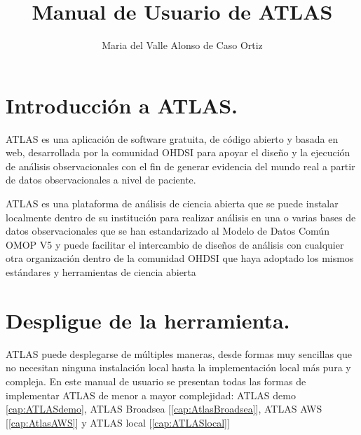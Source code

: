 \documentclass{article}
\title{Manual de Usuario de ATLAS}
\author{Maria del Valle Alonso de Caso Ortiz}
\begin{document}
\maketitle



\section{Introducción a ATLAS.}

ATLAS es una aplicación de software gratuita, de código abierto y basada en web, desarrollada por la comunidad OHDSI para apoyar el diseño y la ejecución de análisis observacionales con el fin de generar evidencia del mundo real a partir de datos observacionales a nivel de paciente.

ATLAS es una plataforma de análisis de ciencia abierta que se puede instalar localmente dentro de su institución para realizar análisis en una o varias bases de datos observacionales que se han estandarizado al Modelo de Datos Común OMOP V5 y puede facilitar el intercambio de diseños de análisis con cualquier otra organización dentro de la comunidad OHDSI que haya adoptado los mismos estándares y herramientas de ciencia abierta \cite{OHDSIAtlasWiki}



\section{Despligue de la herramienta.}

ATLAS puede desplegarse de múltiples maneras, desde formas muy sencillas que no necesitan ninguna instalación local hasta la implementación local más pura y compleja. En este manual de usuario se presentan todas las formas de implementar ATLAS de menor a mayor complejidad: ATLAS demo \ref{cap:ATLASdemo}, ATLAS Broadsea [\ref{cap:AtlasBroadsea}], ATLAS AWS [\ref{cap:AtlasAWS}] y ATLAS local [\ref{cap:ATLASlocal}]

\end{document}
